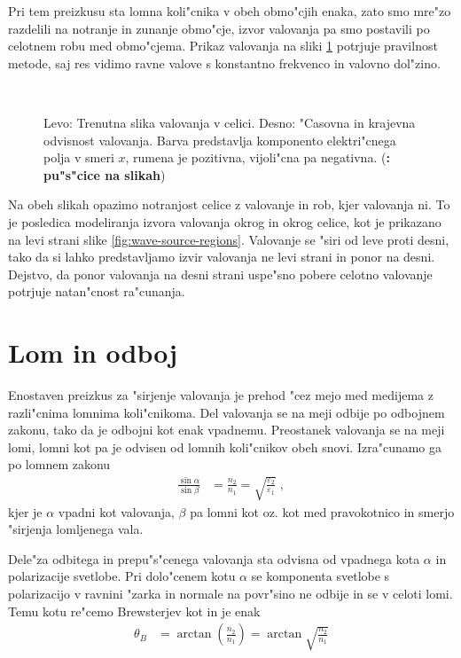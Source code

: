 \documentclass[12pt,twoside,openright,final]{report}
\newcommand{\todo}[1]{(\textbf{\textsmaller{TODO}: #1})}
\begin{document}
Pri tem preizkusu sta lomna koli"cnika v obeh obmo"cjih enaka, zato smo mre"zo razdelili na notranje in zunanje obmo"cje, izvor valovanja pa smo postavili po celotnem robu med obmo"cjema. 
Prikaz valovanja na sliki \ref{fig:test-plane} potrjuje pravilnost metode, saj res vidimo ravne valove s konstantno frekvenco in valovno dol"zino. 

\begin{figure}[h]
 \centering
  \,
\caption{Levo: Trenutna slika valovanja v celici. Desno: "Casovna in krajevna odvisnost valovanja. Barva predstavlja komponento elektri"cnega polja v smeri $x$, rumena je pozitivna, vijoli"cna pa negativna. \todo{pu"s"cice na slikah}}
\label{fig:test-plane}
\end{figure}

Na obeh slikah opazimo notranjost celice z valovanje in rob, kjer valovanja ni.
To je posledica modeliranja izvora valovanja okrog in okrog celice, kot je prikazano na levi strani slike \ref{fig:wave-source-regions}.
Valovanje se "siri od leve proti desni, tako da si lahko predstavljamo izvir valovanja ne levi strani in ponor na desni. 
Dejstvo, da ponor valovanja na desni strani uspe"sno pobere celotno valovanje potrjuje natan"cnost ra"cunanja. 

\section{Lom in odboj}
Enostaven preizkus za "sirjenje valovanja je prehod "cez mejo med medijema z razli"cnima lomnima koli"cnikoma. 
Del valovanja se na meji odbije po odbojnem zakonu, tako da je odbojni kot enak vpadnemu. 
Preostanek valovanja se na meji lomi, lomni kot pa je odvisen od lomnih koli"cnikov obeh snovi. 
Izra"cunamo ga po lomnem zakonu
\begin{align}
 \frac{\sin\alpha}{\sin\beta} &= \frac{n_2}{n_1} = \sqrt{\frac{\varepsilon_2}{\varepsilon_1}}\;, 
\end{align}
kjer je $\alpha$ vpadni kot valovanja, $\beta$ pa lomni kot oz. kot med pravokotnico in smerjo "sirjenja lomljenega vala. 

Dele"za odbitega in prepu"s"cenega valovanja sta odvisna od vpadnega kota $\alpha$ in polarizacije svetlobe\cite{wiki:brewster}. 
Pri dolo"cenem kotu $\alpha$ se komponenta svetlobe s polarizacijo v ravnini "zarka in normale na povr"sino ne odbije in se v celoti lomi. 
Temu kotu re"cemo Brewsterjev kot in je enak
\begin{align}
 \theta_B &= \arctan\left(\frac{n_2}{n_1}\right) = \arctan\sqrt{\frac{n_2}{n_1}}
\end{align}
\end{document}
